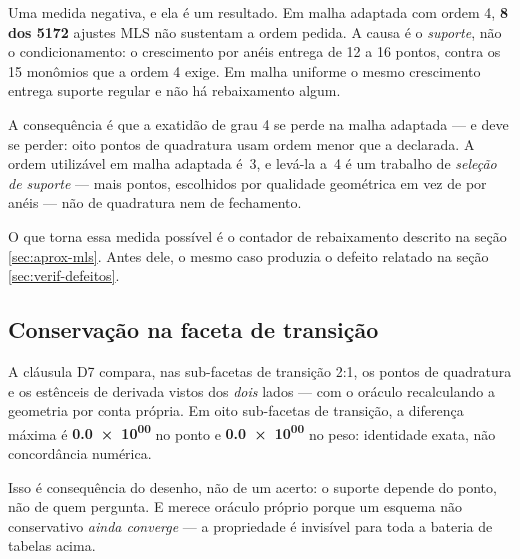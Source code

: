 Uma medida negativa, e ela é um resultado. Em malha adaptada com ordem 4,
\textbf{8 dos \num{5172}} ajustes MLS não sustentam a ordem pedida. A causa é o
\emph{suporte}, não o condicionamento: o crescimento por anéis entrega de 12 a 16
pontos, contra os 15 monômios que a ordem 4 exige. Em malha uniforme o mesmo
crescimento entrega suporte regular e não há rebaixamento algum.

A consequência é que a exatidão de grau 4 se perde na malha adaptada --- e deve
se perder: oito pontos de quadratura usam ordem menor que a declarada. A ordem
utilizável em malha adaptada é~3, e levá-la a~4 é um trabalho de \emph{seleção de
suporte} --- mais pontos, escolhidos por qualidade geométrica em vez de por anéis
--- não de quadratura nem de fechamento.

O que torna essa medida possível é o contador de rebaixamento descrito na seção
\ref{sec:aprox-mls}. Antes dele, o mesmo caso produzia o defeito relatado na
seção \ref{sec:verif-defeitos}.

\subsection{Conservação na faceta de transição}

A cláusula D7 compara, nas sub-facetas de transição 2:1, os pontos de quadratura
e os estênceis de derivada vistos dos \emph{dois} lados --- com o oráculo
recalculando a geometria por conta própria. Em oito sub-facetas de transição, a
diferença máxima é \textbf{\num{0.0e+00}} no ponto e \textbf{\num{0.0e+00}} no
peso: identidade exata, não concordância numérica.

Isso é consequência do desenho, não de um acerto: o suporte depende do ponto, não
de quem pergunta. E merece oráculo próprio porque um esquema não conservativo
\emph{ainda converge} --- a propriedade é invisível para toda a bateria de
tabelas acima.
